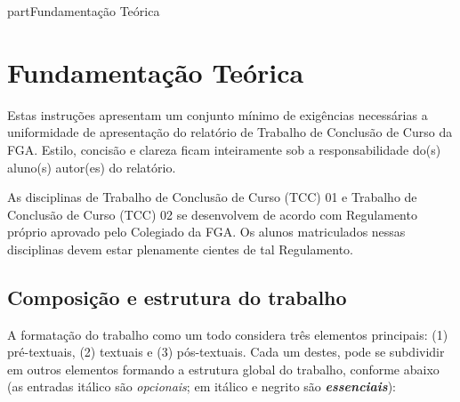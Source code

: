 part{Fundamentação Teórica}

\chapter[Fundamentação Teórica]{Fundamentação Teórica}

Estas instruções apresentam um conjunto mínimo de exigências necessárias a 
uniformidade de apresentação do relatório de Trabalho de Conclusão de Curso 
da FGA. Estilo, concisão e clareza ficam inteiramente sob a 
responsabilidade do(s) aluno(s) autor(es) do relatório.

As disciplinas de Trabalho de Conclusão de Curso (TCC) 01 e Trabalho de 
Conclusão de Curso (TCC) 02 se desenvolvem de acordo com Regulamento 
próprio aprovado pelo Colegiado da FGA. Os alunos matriculados nessas 
disciplinas devem estar plenamente cientes de tal Regulamento. 

\section{Composição e estrutura do trabalho}

A formatação do trabalho como um todo considera três elementos principais: 
(1) pré-textuais, (2) textuais e (3) pós-textuais. Cada um destes, pode se 
subdividir em outros elementos formando a estrutura global do trabalho, 
conforme abaixo (as entradas itálico são \textit{opcionais}; em itálico e
negrito são \textbf{\textit{essenciais}}):

